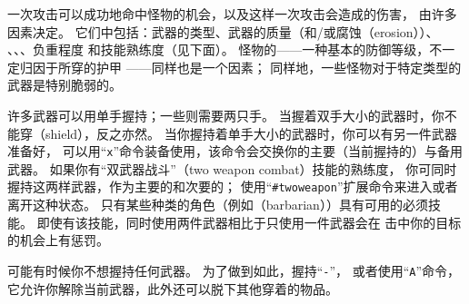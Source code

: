 \documentclass[a4paper, 10pt]{article}
\begin{document}
一次攻击可以成功地命中怪物的机会，以及这样一次攻击会造成的伤害，
由许多因素决定。
它们中包括：武器的类型、武器的质量（\zhTransEnchantments{}和/或腐蚀（erosion））、
\zhTransExperienceLevel、\zhTransStrength、\zhTransDexterity、负重程度
和技能熟练度（见下面）。
怪物的\zhTransArmorClass——一种基本的防御等级，不一定归因于所穿的护甲
——同样也是一个因素；
同样地，一些怪物对于特定类型的武器是特别脆弱的。

许多武器可以用单手握持；一些则需要两只手。
当握着双手大小的武器时，你不能穿\zhTransShield（shield），反之亦然。
当你握持着单手大小的武器时，你可以有另一件武器准备好，
可以用“{\tt x}”命令装备使用，该命令会交换你的主要（当前握持的）与备用武器。
如果你有“双武器战斗”（two weapon combat）技能的熟练度，
你可同时握持这两样武器，作为主要的和次要的；
使用“{\tt \#twoweapon}”扩展命令来进入或者离开这种状态。
只有某些种类的角色（例如\zhTransBarbarians（barbarian））具有可用的必须技能。
即使有该技能，同时使用两件武器相比于只使用一件武器会在
击中你的目标的机会上有惩罚。

可能有时候你不想握持任何武器。
为了做到如此，握持“{\tt -}”，
或者使用“{\tt A}”命令，它允许你解除当前武器，此外还可以脱下其他穿着的物品。
\end{document}
